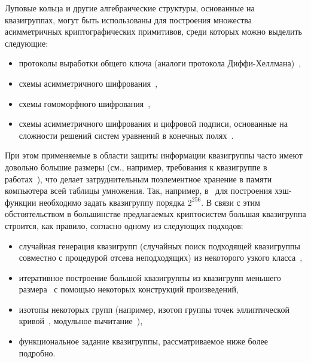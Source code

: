     Луповые кольца и другие алгебраические структуры, основанные на квазигруппах, могут быть использованы для построения множества асимметричных криптографических примитивов, среди которых можно выделить следующие:
    \begin{itemize}
        \item протоколы выработки общего ключа (аналоги протокола Диффи-Хеллмана)~\autocite{DH14, DH16, baryshnikov2017key, quantum18},
        \item схемы асимметричного шифрования~\autocite{markov12, pke10, gribovphd},
        \item схемы гомоморфного шифрования~\autocite{homomo15, gribovphd, katyshev2020application, markov20},
        \item схемы асимметричного шифрования и цифровой подписи, основанные на сложности решений систем уравнений в конечных полях~\autocite{gligoroski2008public, gligoroski2008multivariate, chen2010multivariate, gligoroski2011mqq}.
    \end{itemize}

    При этом применяемые в области защиты информации квазигруппы часто имеют довольно большие размеры (см., например, требования к квазигруппе в работах~\autocite{EdonR, EdonRprime, chen2010multivariate}), что делает затруднительным поэлементное хранение в памяти компьютера всей таблицы умножения. 
    Так, например, в~\autocite{EdonRprime} для построения хэш-функции необходимо задать квазигруппу порядка $2^{256}$. 
    В связи с этим обстоятельством в большинстве предлагаемых криптосистем большая квазигруппа строится, как правило, согласно одному из следующих подходов:
    \begin{itemize}
        \item случайная генерация квазигрупп (случайных поиск подходящей квазигруппы совместно с процедурой отсева неподходящих) из некоторого узкого класса~\autocite{gligoroski2008public, chen2010multivariate},
        \item итеративное построение большой квазигруппы из квазигрупп меньшего размера~\autocite{EdonRprime, gribovphd} с помощью некоторых конструкций произведений,
        \item изотопы некоторых  групп (например, изотоп группы точек эллиптической кривой~\autocite{DH16}, модульное вычитание~\autocite{snavsel2009hash}),
        \item функциональное задание квазигруппы, рассматриваемое ниже более подробно.
    \end{itemize}

